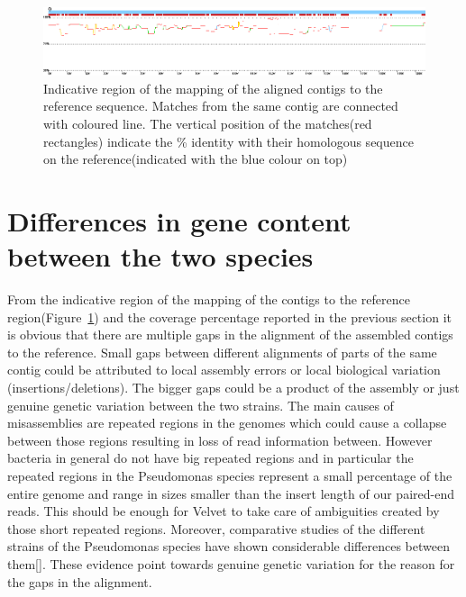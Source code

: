 \documentclass[a4paper,12pt]{article}
\begin{document}
\begin{figure}
  \centering
  \includegraphics[scale=0.53]{images/map_region}
  \caption{Indicative region of the mapping of the aligned contigs to the reference sequence. Matches from the same contig are connected with coloured line. The vertical position of the matches(red rectangles) indicate the \% identity with their homologous sequence on the reference(indicated with the blue colour on top)}

  \label{fig:map}
\end{figure}

\section{Differences in gene content between the two species}
From the indicative region of the mapping of the contigs to the
reference region(Figure~\ref{fig:map}) and the coverage percentage
reported in the previous section it is obvious that there are multiple
gaps in the alignment of the assembled contigs to the reference. Small
gaps between different alignments of parts of the same contig could be
attributed to local assembly errors or local biological variation
(insertions/deletions). The bigger gaps could be a product of the
assembly or just genuine genetic variation between the two
strains. The main causes of misassemblies are repeated regions in the
genomes which could cause a collapse between those regions resulting
in loss of read information between. However bacteria in general do
not have big repeated regions and in particular the repeated regions
in the Pseudomonas species represent a small percentage of the entire
genome and range in sizes smaller than the insert length of our
paired-end reads. This should be enough for Velvet to take care of
ambiguities created by those short repeated regions. Moreover,
comparative studies of the different strains of the Pseudomonas
species have shown considerable differences between
them[\cite{silby2009genomic}]. These evidence point towards genuine
genetic variation for the reason for the gaps in the alignment.
\end{document}
